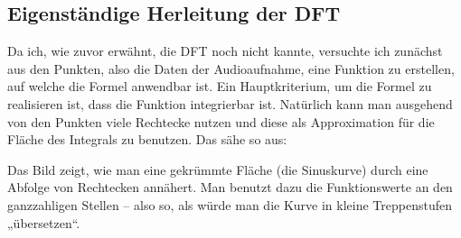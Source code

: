 \documentclass[a4paper,12pt]{article}
\theoremstyle{definition}
\theoremstyle{remark}
\begin{document}
\subsection{Eigenständige Herleitung der DFT}
Da ich, wie zuvor erwähnt, die DFT noch nicht kannte, versuchte ich zunächst aus den Punkten, 
also die Daten der Audioaufnahme, eine Funktion zu erstellen, auf welche die Formel anwendbar 
ist. Ein Hauptkriterium, um die Formel zu realisieren ist, dass die Funktion integrierbar ist. 
Natürlich kann man ausgehend von den Punkten viele Rechtecke nutzen und diese als Approximation 
für die Fläche des Integrals zu benutzen. Das sähe so aus:

\begin{figure}[h!]
\centering
{}
  \end{figure}
Das Bild zeigt, wie man eine gekrümmte Fläche (die Sinuskurve) durch eine Abfolge von Rechtecken 
annähert. Man benutzt dazu die Funktionswerte an den ganzzahligen Stellen – also so, als würde 
man die Kurve in kleine Treppenstufen „übersetzen“. 
\\ \\
\end{document}
